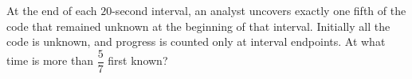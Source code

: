 At the end of each $20$-second interval, an analyst uncovers exactly one fifth of the code that remained unknown at the beginning of that interval. Initially all the code is unknown, and progress is counted only at interval endpoints. At what time is more than $\dfrac{5}{7}$ first known?
